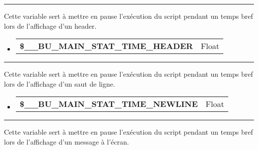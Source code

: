 \documentclass[a4paper,10pt]{article}
\begin{document}

\par\noindent\rule{\textwidth}{0.4pt}

\begin{justify}
    Cette variable sert à mettre en pause l'exécution du script pendant un temps bref lors de l'affichage d'un header.
\end{justify}

\begin{justify}
     \begin{itemize}
        \item
        {
            \begin{tabular}{l|l}
                \textbf{\color{vars}\$\_\_BU\_MAIN\_STAT\_TIME\_HEADER}   & Float\\[1\baselineskip]
            \end{tabular}
        }
    \end{itemize}
\end{justify}


\par\noindent\rule{\textwidth}{0.4pt}

\begin{justify}
    Cette variable sert à mettre en pause l'exécution du script pendant un temps bref lors de l'affichage d'un saut de ligne.
\end{justify}

\begin{justify}
     \begin{itemize}
        \item
        {
            \begin{tabular}{l|l}
                \textbf{\color{vars}\$\_\_BU\_MAIN\_STAT\_TIME\_NEWLINE}  & Float\\[1\baselineskip]
            \end{tabular}
        }
    \end{itemize}
\end{justify}


\par\noindent\rule{\textwidth}{0.4pt}

\begin{justify}
    Cette variable sert à mettre en pause l'exécution du script pendant un temps bref lors de l'affichage d'un message à l'écran.
\end{justify}
\end{document}
